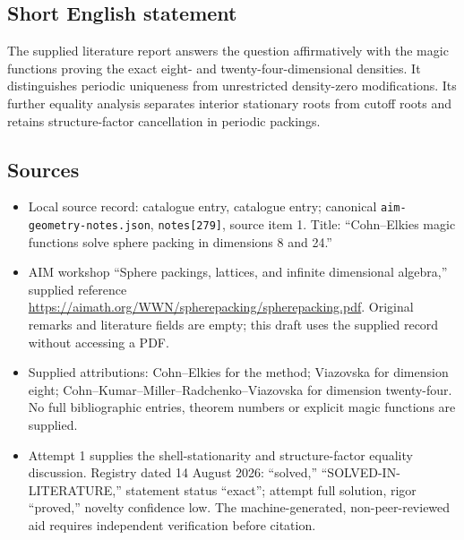 \documentclass[11pt]{article}
\begin{document}
\subsection{Short English statement}
The supplied literature report answers the question affirmatively with the magic functions proving the exact eight- and twenty-four-dimensional densities. It distinguishes periodic uniqueness from unrestricted density-zero modifications. Its further equality analysis separates interior stationary roots from cutoff roots and retains structure-factor cancellation in periodic packings.
\subsection{Sources}
\begin{itemize}
\item Local source record: catalogue entry, catalogue entry; canonical \texttt{aim-geometry-notes.json}, \texttt{notes[279]}, source item 1. Title: ``Cohn--Elkies magic functions solve sphere packing in dimensions 8 and 24.''
\item AIM workshop ``Sphere packings, lattices, and infinite dimensional algebra,'' supplied reference \url{https://aimath.org/WWN/spherepacking/spherepacking.pdf}. Original remarks and literature fields are empty; this draft uses the supplied record without accessing a PDF.
\item Supplied attributions: Cohn--Elkies for the method; Viazovska for dimension eight; Cohn--Kumar--Miller--Radchenko--Viazovska for dimension twenty-four. No full bibliographic entries, theorem numbers or explicit magic functions are supplied.
\item Attempt 1 supplies the shell-stationarity and structure-factor equality discussion. Registry dated 14 August 2026: ``solved,'' ``SOLVED-IN-LITERATURE,'' statement status ``exact''; attempt full solution, rigor ``proved,'' novelty confidence low. The machine-generated, non-peer-reviewed aid requires independent verification before citation.
\end{itemize}
\end{document}
